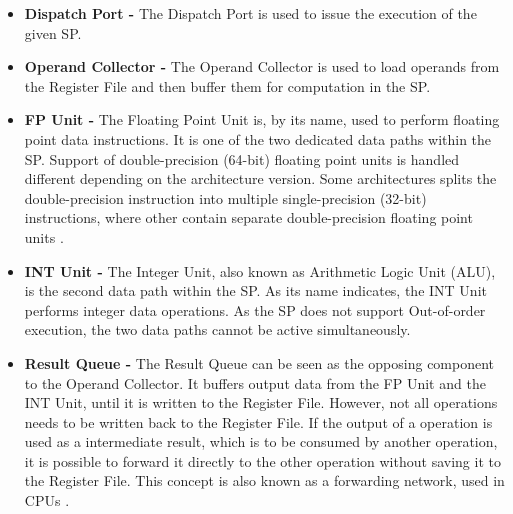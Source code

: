 \begin{itemize}
	\item \textbf{Dispatch Port -} The Dispatch Port is used to issue the execution of the given SP.
	\item \textbf{Operand Collector -} The Operand Collector is used to load operands from the Register File and then buffer them for computation in the SP.
	
	\item \textbf{FP Unit -} The Floating Point Unit is, by its name, used to perform floating point data instructions.
	It is one of the two dedicated data paths within the SP.
	Support of double-precision (64-bit) floating point units is handled different depending on the architecture version.
	Some architectures splits the double-precision instruction into multiple single-precision (32-bit) instructions, where other contain separate double-precision floating point units \cite{Johansson2010}.
	
	\item \textbf{INT Unit -} The Integer Unit, also known as Arithmetic Logic Unit (ALU), is the second data path within the SP. 
	As its name indicates, the INT Unit performs integer data operations.
	As the SP does not support Out-of-order execution, the two data paths cannot be active simultaneously.
	
	\item \textbf{Result Queue -} The Result Queue can be seen as the opposing component to the Operand Collector.
	It buffers output data from the FP Unit and the INT Unit, until it is written to the Register File.
	However, not all operations needs to be written back to the Register File.
	If the output of a operation is used as a intermediate result, which is to be consumed by another operation, it is possible to forward it directly to the other operation without saving it to the Register File.
	This concept is also known as a forwarding network, used in CPUs \cite{Kanter2009}.
\end{itemize}


